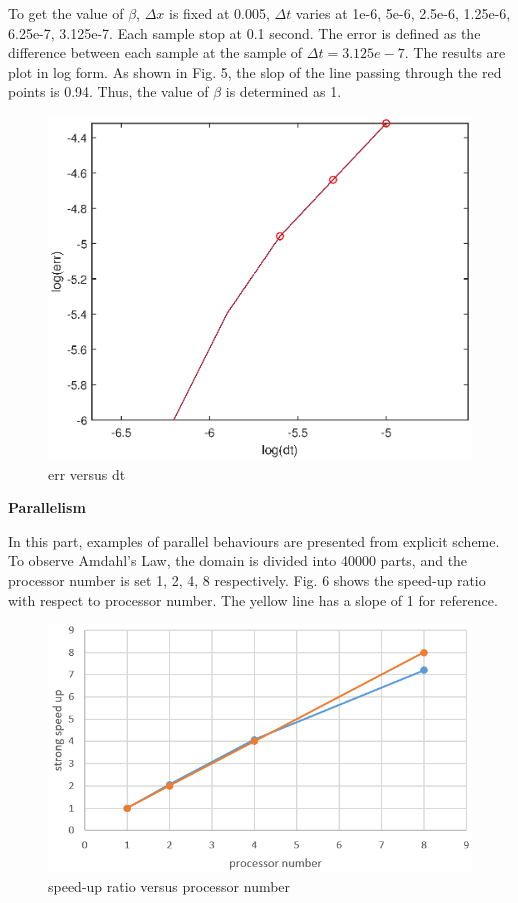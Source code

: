 \documentclass[a4paper,10pt]{article}
\begin{document}
To get the value of $\beta$, $\Delta x$ is fixed at 0.005, $\Delta t$ varies at 1e-6, 5e-6, 2.5e-6, 1.25e-6, 6.25e-7, 3.125e-7. Each sample stop at 0.1 second. The error is defined as the difference between each sample at the sample of $\Delta t = 3.125e-7$. The results are plot in log form. As shown in Fig. 5, the slop of the line passing through the red points is 0.94. Thus, the value of $\beta$ is determined as 1.
\begin{figure}[h]
	\centering
	\includegraphics[scale=0.65]{beta.eps}
	\caption{err versus dt}
\end{figure}

\clearpage

\large \textbf {Parallelism}

In this part, examples of parallel behaviours are presented from explicit scheme. To observe Amdahl's Law, the domain is divided into 40000 parts, and the processor number is set 1, 2, 4, 8 respectively. Fig. 6 shows the speed-up ratio with respect to processor number. The yellow line has a slope of 1 for reference. 
\begin{figure}[h]
	\centering
	\includegraphics[scale=0.6]{Amdahl.png}
	\caption{speed-up ratio versus processor number}
\end{figure} \\
\end{document}
